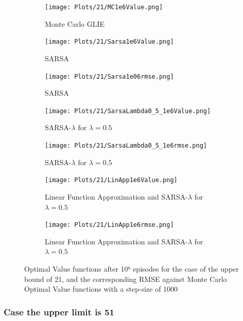 \documentclass[12pt,a4paper]{article}
\begin{document}
\begin{figure}
	\begin{subfigure}{.4\textwidth}
		\centering
		\label{E21_MC_V}
		\centering
		\texttt{[image: Plots/21/MC1e6Value.png]}
		\caption{Monte Carlo GLIE}
	\end{subfigure}%
	
	\begin{subfigure}{.4\textwidth}
		\centering
		\texttt{[image: Plots/21/Sarsa1e6Value.png]}
		\caption{\label{E21_S_V} SARSA}
	\end{subfigure}%
	\begin{subfigure}{.4\textwidth}
		\centering
		\texttt{[image: Plots/21/Sarsa1e06rmse.png]}
		\caption{\label{E21_S_V} SARSA}
	\end{subfigure}%
	
	
	\begin{subfigure}{.4\textwidth}
		\centering
		\texttt{[image: Plots/21/SarsaLambda0\_5\_1e6Value.png]}
		\caption{\label{E21_SL_V} SARSA-$\lambda$ for $\lambda=0.5$}
	\end{subfigure}%
	\begin{subfigure}{.4\textwidth}
		\centering
		\texttt{[image: Plots/21/SarsaLambda0\_5\_1e6rmse.png]}
		\caption{\label{E21_S_V} SARSA-$\lambda$ for $\lambda=0.5$}
	\end{subfigure}%
	
	
	\begin{subfigure}{.4\textwidth}
		\centering
		\texttt{[image: Plots/21/LinApp1e6Value.png]}
		\caption{\label{E21_SL_LA_V} Linear Function Approximation and SARSA-$\lambda$ for $\lambda=0.5$}
	\end{subfigure}%
	\begin{subfigure}{.4\textwidth}
		\centering
		\texttt{[image: Plots/21/LinApp1e6rmse.png]}
		\caption{\label{E21_S_V} Linear Function Approximation and SARSA-$\lambda$ for $\lambda=0.5$}
	\end{subfigure}%
	
	\caption{Optimal Value functions after 10⁶ episodes for the case of the upper bound of 21, and the corresponding RMSE against Monte Carlo Optimal Value functions with a step-size of 1000}
	\label{fig:case21}
\end{figure}



\newpage
\subsubsection{Case the upper limit is 51}
\end{document}
